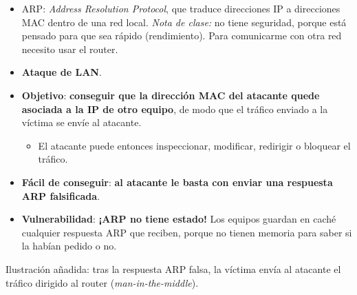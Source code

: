 \documentclass[11pt,a4paper]{report}
\begin{document}
\begin{itemize}
  \item ARP: \emph{Address Resolution Protocol}, que traduce direcciones IP a direcciones MAC dentro de una red local. \emph{Nota de clase:} no tiene seguridad, porque está pensado para que sea rápido (rendimiento). Para comunicarme con otra red necesito usar el router.
  \item \textbf{Ataque de LAN}.
  \item \textbf{Objetivo}: \textbf{conseguir que la dirección MAC del atacante quede asociada a la IP de otro equipo}, de modo que el tráfico enviado a la víctima se envíe al atacante.
    \begin{itemize}
      \item El atacante puede entonces inspeccionar, modificar, redirigir o bloquear el tráfico.
    \end{itemize}
  \item \textbf{Fácil de conseguir}: \textbf{al atacante le basta con enviar una respuesta ARP falsificada}.
  \item \textbf{Vulnerabilidad}: \textbf{¡ARP no tiene estado!} Los equipos guardan en caché cualquier respuesta ARP que reciben, porque no tienen memoria para saber si la habían pedido o no.
\end{itemize}
 
\begin{center}
\end{center}
{\small Ilustración añadida: tras la respuesta ARP falsa, la víctima envía al atacante el tráfico dirigido al router (\emph{man-in-the-middle}).}
 
\end{document}
